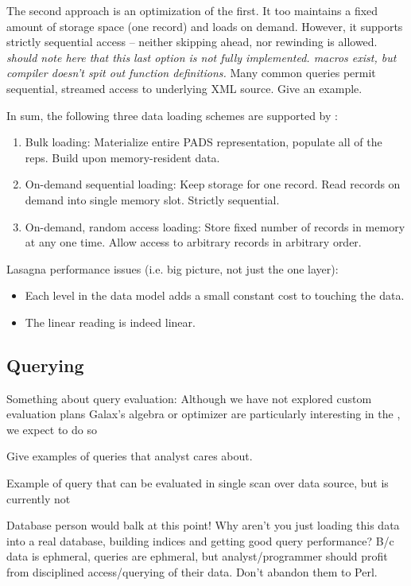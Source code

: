 The second approach is an optimization of the first. It too maintains
a fixed amount of storage space (one record) and loads on demand. However, it
supports strictly sequential access -- neither skipping ahead, nor
rewinding is allowed. {\em should note here that this last option is
  not fully implemented. macros exist, but compiler doesn't spit out
  function definitions.}   Many common queries permit sequential,
  streamed access to underlying XML source.  Give an example.

In sum, the following three data loading schemes are supported by \padx:

\begin{enumerate}
\item Bulk loading: Materialize entire PADS representation, populate all
  of the \pads reps. Build \padx \condm upon memory-resident data.

\item On-demand sequential loading: Keep storage for one record. Read
  records on demand into single memory slot. Strictly sequential.

\item On-demand, random access loading: Store fixed number of records in
  memory at any one time. Allow access to arbitrary records in
  arbitrary order.
\end{enumerate}

Lasagna performance issues (i.e. big picture, not just the one layer):

\begin{itemize}
\item Each level in the data model adds a small constant cost to
  touching the data.
\item The linear reading is indeed linear.
\end{itemize}

\subsection{Querying}

Something about query evaluation:
Although we have not explored custom evaluation plans 
Galax's algebra or optimizer are particularly interesting in the 
\padx{}, we expect to do so 

Give examples of queries that analyst cares about. 

Example of query that can be evaluated in single scan over data
source, but is currently not 

Database person would balk at this point!  Why aren't you just loading
this data into a real database, building indices and getting good
query performance?  B/c data is ephmeral, queries are ephmeral, but
analyst/programmer should profit from disciplined access/querying of
their data.  Don't abandon them to Perl. 

